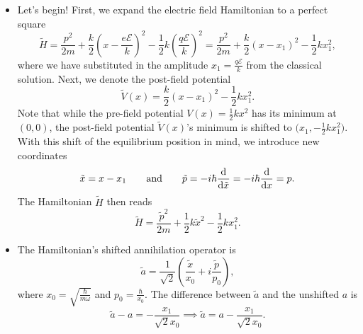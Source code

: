 \documentclass[11pt, a4paper]{article}
\newcommand{\eqtext}[1]{\qquad \text{#1} \qquad}
\begin{document}
\begin{itemize}
	\item Let's begin! First, we expand the electric field Hamiltonian to a perfect square
	\begin{equation*}
		\tilde{H} = \frac{p^{2}}{2m} + \frac{k}{2}\left(x - \frac{e\mathcal{E}}{k}\right)^{2} - \frac{1}{2}k\left(\frac{q\mathcal{E}}{k}\right)^{2} = \frac{p^{2}}{2m} + \frac{k}{2}\left(x - x_{1}\right)^{2} - \frac{1}{2}kx_{1}^{2},
	\end{equation*}
	where we have substituted in the amplitude $ x_{1} = \frac{q\mathcal{E}}{k} $ from the classical solution. Next, we denote the post-field potential
	\begin{equation*}
		\tilde{V}(x) = \frac{k}{2}\left(x - x_{1}\right)^{2} - \frac{1}{2}kx_{1}^{2}.
	\end{equation*}
	Note that while the pre-field potential $ V(x) = \frac{1}{2}kx^{2} $ has its minimum at $ (0, 0) $, the post-field potential $ \tilde{V}(x) $'s minimum is shifted to $ \big(x_{1}, - \frac{1}{2}kx_{1}^{2}\big) $. With this shift of the equilibrium position in mind, we introduce new coordinates
	\begin{equation*}
		\tilde{x} = x - x_{1} \eqtext{and} \tilde{p} = - i\hbar
 		\dv{\tilde{x}} = -i \hbar \dv{x} = p.
 	\end{equation*}
 	The Hamiltonian $ \tilde{H} $ then reads
 	\begin{equation*}
 		\tilde{H} = \frac{\tilde{p}^{2}}{2m} + \frac{1}{2}k\tilde{x}^{2} - \frac{1}{2}kx_{1}^{2}.
 	\end{equation*}
 	
 	\item The Hamiltonian's shifted annihilation operator is
 	\begin{equation*}
 		\tilde{a} = \frac{1}{\sqrt{2}}\left(\frac{\tilde{x}}{x_{0}} + i\frac{\tilde{p}}{p_{0}}\right),
 	\end{equation*}
 	where $ x_{0} = \sqrt{\frac{\hbar}{m\omega}}$ and $ p_{0} = \frac{\hbar}{x_{0}} $. The difference between $ \tilde{a} $  and the unshifted $ a $ is
 	\begin{equation*}
 		\tilde{a} - a = -\frac{x_{1}}{\sqrt{2}x_{0}} \implies \tilde{a} = a -\frac{x_{1}}{\sqrt{2}x_{0}}.
 	\end{equation*}
 	

\end{itemize}
\end{document}
